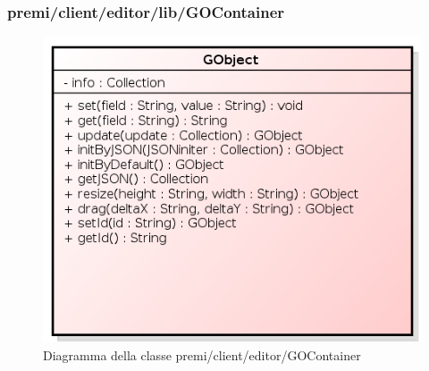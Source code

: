 \subsubsection{premi/client/editor/lib/GOContainer}
\begin{figure}[h]
\begin{center}
\includegraphics[scale=0.40]{img/diacla/GObject.png}
\caption{Diagramma della classe premi/client/editor/GOContainer}
\end{center}
\end{figure}

